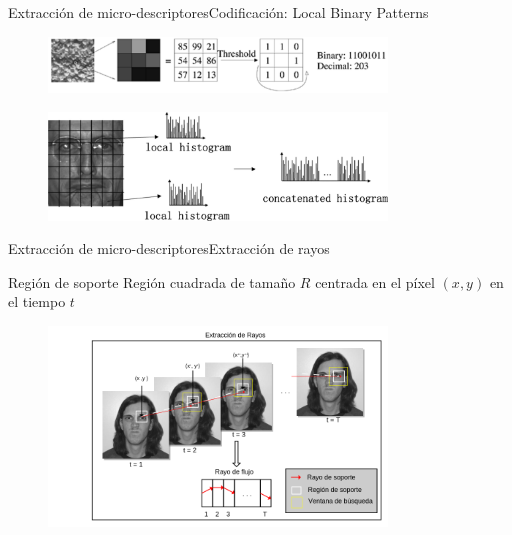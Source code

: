 \documentclass{beamer}
\begin{document}
   		\begin{frame}{Extracción de micro-descriptores}{Codificación: Local Binary Patterns}
   			\begin{figure}[bt]
   				\centering
   				\includegraphics[width=9cm]{imagenes/lbp.pdf}
   			\end{figure}	
   			
   			\begin{figure}[bt]
   				\centering
   				\includegraphics[width=9cm]{imagenes/lbp_histogram.png}
   			\end{figure}	  
   		\end{frame}
    
        \begin{frame}{Extracción de micro-descriptores}{Extracción de rayos}
			\begin{block}{Región de soporte}
            		Región cuadrada de tamaño $R$ centrada en el píxel $(x,y)$ en el tiempo $t$
            \end{block}    			
    			
    			\begin{figure}[bt]
        			\centering
                \includegraphics[width=9cm]{imagenes/Extraccion_de_rayos.png}
            \end{figure}        
	        
        \end{frame}
    
\end{document}
